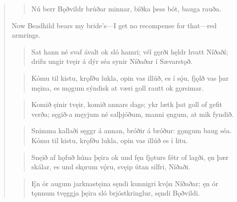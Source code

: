 \begin{verse}

\begin{verse}
\bva Nú berr Bǫðvildr \hld brúðar minnar,
bíðka þess bót, \hld bauga rauða. \\%
\end{verse}

\bvb Now Beadhild bears my bride's—I get no recompense for that—red armrings.

\begin{verse}
\bva Sat hann né svaf ávalt \hld ok sló hamri;
vél gęrði hęldr \hld hvatt Níðaðí;
drifu ungir tvęir \hld á dýr séa
synir Níðaðar \hld í Sævarstǫð. \\%
\end{verse}


\begin{verse}
\bva Kómu til kistu, \hld krǫfðu lukla,
opin vas illúð, \hld es í sǫ́u,
fjǫlð vas þar męina, \hld es mǫgum sýndisk
at væri goll rautt \hld ok gǫrsimar. \\%
\end{verse}


\begin{verse}
\bva Komið ęinir tvęir, \hld komið annars dags;
ykr lætk þat goll \hld of gefit verða;
sęgið-a męyjum \hld né salþjóðum,
manni ęngum, \hld at mik fyndið. \\%
\end{verse}


\begin{verse}
\bva Snimma kallaði \hld sęggr á annan,
bróðir á bróður: \hld gǫngum baug séa.
Kómu til kistu, \hld krǫfðu lukla,
opin vas illúð \hld es í litu. \\%
\end{verse}


\begin{verse}
\bva Snęið af hǫfuð \hld húna þęira
ok und fęn fjǫturs \hld fǿtr of lagði,
ęn þær skálar, \hld es und skǫrum vǫ́ru,
svęip útan silfri,  Níðaði. \\%
\end{verse}


\begin{verse}
\bva Ęn ór augum \hld jarknastęina
sęndi kunnigri \hld kvǫ́n Níðaðar;
ęn ór tǫnnum \hld tvęggja þęira
sló brjóstkringlur, \hld sęndi Bǫðvildi. \\%
\end{verse}


\end{verse}
